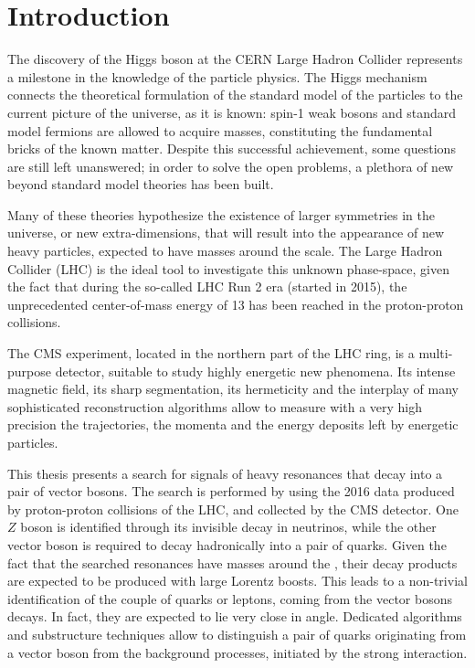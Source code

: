 \chapter{Introduction}

The discovery of the Higgs boson at the CERN Large Hadron Collider represents a milestone in the knowledge of the particle physics. The Higgs mechanism connects the theoretical formulation of the standard model of the particles to the current picture of the universe, as it is known: spin-1 weak bosons and standard model fermions are allowed to acquire masses, constituting the fundamental bricks of the known matter. Despite this successful achievement, some questions are still left unanswered; in order to solve the open problems, a plethora of new beyond standard model theories has been built.

\noindent Many of these theories hypothesize the existence of larger symmetries in the universe, or new extra-dimensions, that will result into the appearance of new heavy particles, expected to have masses around the \TeV scale. The Large Hadron Collider (LHC) is the ideal tool to investigate this unknown phase-space, given the fact that during the so-called LHC Run 2 era (started in 2015), the unprecedented center-of-mass energy of 13 \TeV has been reached in the proton-proton collisions.

\noindent The CMS experiment, located in the northern part of the LHC ring, is a multi-purpose detector, suitable to study highly energetic new phenomena. Its intense magnetic field, its sharp segmentation, its hermeticity and the interplay of many sophisticated reconstruction algorithms allow to measure with a very high precision the trajectories, the momenta and the energy deposits left by energetic particles.

\vspace*{1\baselineskip}

\noindent This thesis presents a search for signals of heavy resonances that decay into a pair of vector bosons. The search is performed by using the 2016 data produced by proton-proton collisions of the LHC, and collected by the CMS detector. One $Z$ boson is identified through its invisible decay in neutrinos, while the other vector boson is required to decay hadronically into a pair of quarks. Given the fact that the searched resonances have masses around the \TeV, their decay products are expected to be produced with large Lorentz boosts. This leads to a non-trivial identification of the couple of quarks or leptons, coming from the vector bosons decays. In fact, they are expected to lie very close in angle. Dedicated algorithms and substructure techniques allow to distinguish a pair of quarks originating from a vector boson from the background processes, initiated by the strong interaction.

